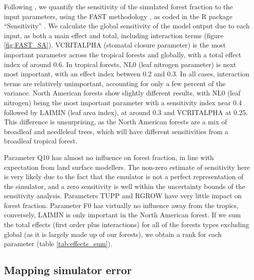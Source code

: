 \documentclass[esd, manuscript]{copernicus}
\begin{document}
Following \citep{carslaw2013large}, we quantify the sensitivity of the simulated forest fraction to the input parameters, using the FAST methodology \citep{saltelli1999sensitivity}, as coded in the R package “Sensitivity” \citep{Rpackage2015sensitivity} . We calculate the global sensitivity of the model output due to each input, as both a main effect and total, including interaction terms (figure \ref{fig:FAST_SA}). VCRITALPHA (stomatal closure parameter) is the most important parameter across the tropical forests and globally, with a total effect index of around 0.6. In tropical forests, NL0 (leaf nitrogen parameter) is next most important, with an effect index between 0.2 and 0.3. In all cases, interaction terms are relatively unimportant, accounting for only a few percent of the variance. North American forests show slightly different results, with NL0 (leaf nitrogen) being the most important parameter with a sensitivity index near 0.4 followed by LAIMIN (leaf area index), at around 0.3 and VCRITALPHA at 0.25. This difference is unsurprising, as the North American forests are a mix of broadleaf and needleleaf trees, which will have different sensitivities from a broadleaf tropical forest.


Parameter Q10 has almost no influence on forest fraction, in line with expectation from land surface modellers. The non-zero estimate of sensitivity here is very likely due to the fact that the emulator is not a perfect representation of the simulator, and a zero sensitivity is well within the uncertainty bounds of the sensitivity analysis. Parameters TUPP and RGROW have very little impact on forest fraction. Parameter F0 has virtually no influence away from the tropics, conversely, LAIMIN is only important in the North American forest. If we sum the total effects (first order plus interactions) for all of the forests types excluding global (as it is largely made up of our forests), we obtain a rank for each parameter (table \ref{tab:effects_sum}).

%	

\subsection{Mapping simulator error}\label{mapping}
\end{document}
